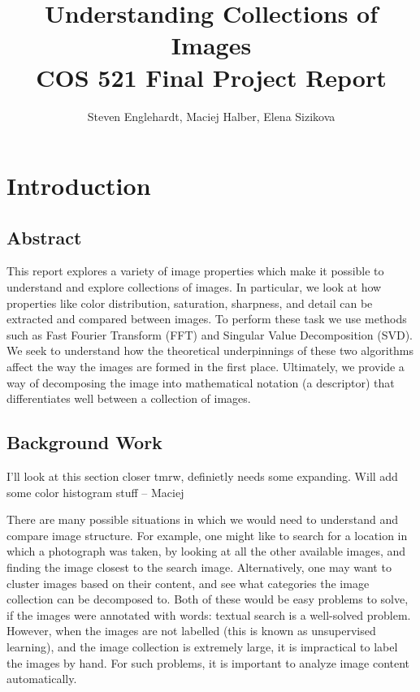 \documentclass{report}
\author{Steven Englehardt, Maciej Halber, Elena Sizikova}
\title{Understanding Collections of Images \\ \small{COS 521 Final Project Report}}
\begin{document}
\maketitle
\tableofcontents

\chapter{Introduction}
\section{Abstract}
This report explores a variety of image properties which make it possible to understand and explore collections of images. In particular, we look at how properties like color distribution, saturation, sharpness, and detail can be extracted and compared between images. To perform these task we use methods such as Fast Fourier Transform (FFT) and Singular Value Decomposition (SVD). We seek to understand how the theoretical underpinnings of these two algorithms affect the way the images are formed in the first place. Ultimately, we provide a way of decomposing the image into mathematical notation (a descriptor) that differentiates well between a collection of images.

\section{Background Work}
{\color{red} I'll look at this section closer tmrw, definietly needs some expanding. Will add some color histogram stuff  -- Maciej}

There are many possible situations in which we would need to understand and compare image structure. For example, one might like to search for a location in which a photograph was taken, by looking at all the other available images, and finding the image closest to the search image. Alternatively, one may want to cluster images based on their content, and see what categories the image collection can be decomposed to. Both of these would be easy problems to solve, if the images were annotated with words: textual search is a well-solved problem. However, when the images are not labelled (this is known as unsupervised learning), and the image collection is extremely large, it is impractical to label the images by hand. For such problems, it is important to analyze image content automatically.
\end{document}
